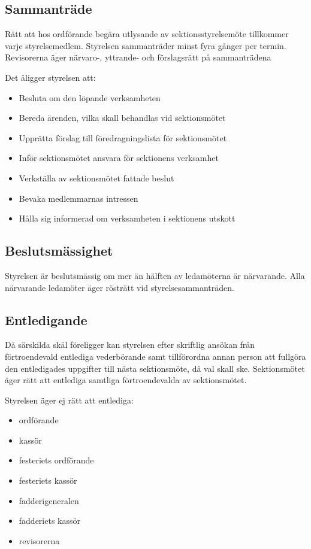 \documentclass{datateknologsektionen-document}
\begin{document}
    \subsection{Sammanträde}
      \label{sektionsstyrelsensammantrade}
      Rätt att hos ordförande begära utlysande av sektionsstyrelsemöte tillkommer varje
      styrelsemedlem. Styrelsen sammanträder minst fyra gånger per termin. Revisorerna äger
      närvaro-, yttrande- och förslagsrätt på sammanträdena

      Det åligger styrelsen att:
      \begin{itemize}
        \item Besluta om den löpande verksamheten
        \item Bereda ärenden, vilka skall behandlas vid sektionsmötet
        \item Upprätta förslag till föredragningslista för sektionsmötet
        \item Inför sektionsmötet ansvara för sektionens verksamhet
        \item Verkställa av sektionsmötet fattade beslut
        \item Bevaka medlemmarnas intressen
        \item Hålla sig informerad om verksamheten i sektionens utskott
      \end{itemize}
    \subsection{Beslutsmässighet}
      Styrelsen är beslutsmässig om mer än hälften av ledamöterna är närvarande. Alla
      närvarande ledamöter äger rösträtt vid styrelsesammanträden.
    \subsection{Entledigande}
      Då särskilda skäl föreligger kan styrelsen efter skriftlig ansökan från förtroendevald
      entlediga vederbörande samt tillförordna annan person att fullgöra den entledigades
      uppgifter till nästa sektionsmöte, då val skall ske. Sektionsmötet äger rätt att entlediga
      samtliga förtroendevalda av sektionsmötet.

      Styrelsen äger ej rätt att entlediga:
      \begin{itemize}
        \item ordförande
        \item kassör
        \item festeriets ordförande
        \item festeriets kassör
        \item fadderigeneralen
        \item fadderiets kassör
        \item revisorerna
      \end{itemize}
\end{document}
